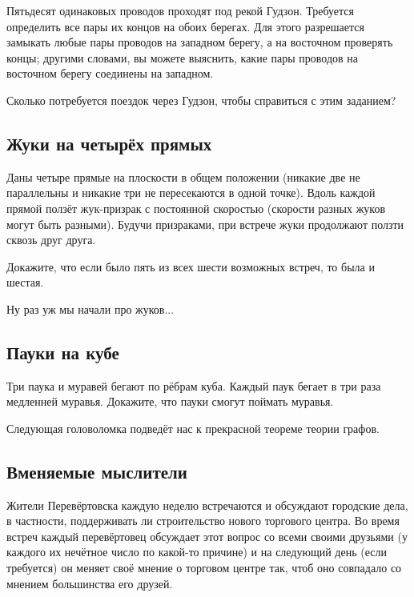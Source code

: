 Пятьдесят одинаковых проводов проходят под рекой Гудзон.
Требуется определить все пары их концов на обоих берегах.
Для этого разрешается замыкать любые пары проводов на западном берегу, а на восточном проверять концы;
другими словами, вы можете выяснить, какие пары проводов на восточном берегу соединены на западном.

Сколько потребуется поездок через Гудзон, чтобы справиться с этим заданием?

\subsection*{Жуки на четырёх прямых}

Даны четыре прямые на плоскости в общем положении (никакие две не параллельны и никакие три не пересекаются в одной точке).
Вдоль каждой прямой ползёт жук-призрак с постоянной скоростью (скорости разных жуков могут быть разными).
Будучи призраками, при встрече жуки продолжают ползти сквозь друг друга.

Докажите, что если было пять из всех шести возможных встреч,
то была и шестая.

\medskip

Ну раз уж мы начали про жуков...

\subsection*{Пауки на кубе}

Три паука и муравей бегают по рёбрам куба.
Каждый паук бегает в три раза медленней муравья.
Докажите, что пауки смогут поймать муравья.

\medskip

Следующая головоломка подведёт нас к прекрасной теореме теории графов.

\subsection*{Вменяемые мыслители}\label{Вменяемые мыслители}

Жители Перевёртовска каждую неделю встречаются и обсуждают городские дела, в частности, поддерживать ли строительство нового торгового центра.
Во время встреч каждый перевёртовец обсуждает этот вопрос со всеми своими друзьями (у каждого их нечётное число по какой-то причине) и на следующий день (если требуется) он меняет своё мнение о торговом центре так, чтоб оно совпадало со мнением большинства его друзей.

